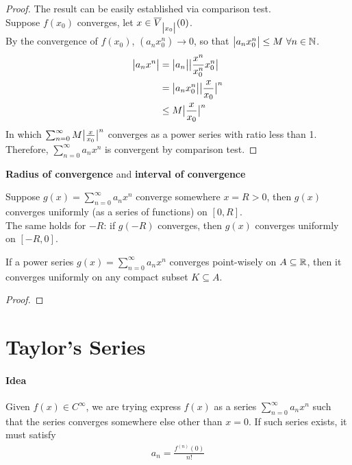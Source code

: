 \documentclass[11pt]{article}
\begin{document}
 	\begin{proof}
 		The result can be easily established via comparison test. \\
 		Suppose $f(x_0)$ converges, let $x \in \overline{V}_{\big \vert {x_0} \big \vert}(0)$. \\
 		By the convergence of $f(x_0)$, $(a_n x_0^n) \to 0$, so that $\big \vert {a_n x_0^n} \big \vert \leq M\ \forall n \in \mathbb{N}$.
 		\begin{align}
 			\big \vert {a_n x^n} \big \vert &= \big \vert {a_n} \big \vert \big \vert {\frac{x^n}{x_0^n} x_0^n} \big \vert \\
 			&= \big \vert {a_n x_0^n} \big \vert \big \vert {\frac{x}{x_0}} \big \vert^n \\
 			&\leq M \big \vert {\frac{x}{x_0}} \big \vert^n 
 		\end{align}
 		In which $\sum_{n=0}^\infty M \big \vert {\frac{x}{x_0}} \big \vert^n$ converges as a power series with ratio less than 1. \\
 		Therefore, $\sum_{n=0}^\infty a_n x^n$ is convergent by comparison test.
 	\end{proof}
 	
 	\begin{definition}
 		\textbf{Radius of convergence} and \textbf{interval of convergence}
 	\end{definition}
 	
 	\begin{theorem}
 		Suppose $g(x) = \sum_{n=0}^\infty a_n x^n$ converge somewhere $x = R > 0$, then $g(x)$ converges uniformly (as a series of functions) on $[0, R]$. \\
 		The same holds for $-R$: if $g(-R)$ converges, then $g(x)$ converges uniformly on $[-R, 0]$.
 	\end{theorem}
 	
 	\begin{theorem}
 		If a power series $g(x) = \sum_{n=0}^\infty a_n x^n$ converges point-wisely on $A \subseteq \mathbb{R}$, then it converges uniformly on any compact subset $K \subseteq A$.
 	\end{theorem}
 	
 	\begin{proof}
 	\end{proof}
 	
 	\section{Taylor's Series}
 	\paragraph{Idea} Given $f(x) \in C^\infty$, we are trying express $f(x)$ as a series $\sum_{n=0}^\infty a_n x^n$ such that the series converges somewhere else other than $x=0$. If such series exists, it must satisfy
 	\begin{align}
 		a_n = \frac{f^{(n)}(0)}{n!}
 	\end{align}
 	
\end{document}
